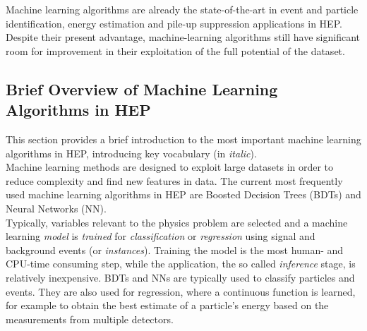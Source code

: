 
Machine learning algorithms are already the state-of-the-art in event and particle identification, energy estimation and pile-up suppression applications in HEP. Despite their present advantage, machine-learning algorithms still have significant room for improvement in their exploitation of the full potential of the dataset.


\subsection{Brief Overview of Machine Learning Algorithms in HEP}

This section provides a brief introduction to the most important machine learning algorithms in HEP, introducing key vocabulary (in \textit{italic}).\\


Machine learning methods are designed to exploit large datasets in order to reduce complexity and find new features in data. The current most frequently used machine learning algorithms in HEP are Boosted Decision Trees (BDTs) and Neural Networks (NN).\\

Typically, variables relevant to the physics problem are selected and a machine learning \textit{model} is \textit{trained} for \textit{classification} or \textit{regression} using signal and background events (or \textit{instances}).
Training the model is the most human- and CPU-time consuming step, while the application, the so called \textit{inference} stage, is relatively inexpensive.
BDTs and NNs are typically used to classify particles and events.
They are also used for regression, where a continuous function is learned, for example to obtain the best estimate of a particle's energy based on the measurements from multiple detectors.\\

